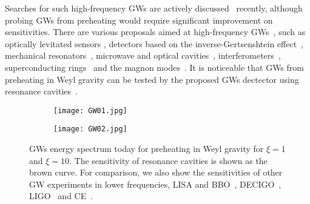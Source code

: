 \documentclass[12pt, a4paper]{article}
\begin{document}
Searches for such high-frequency GWs are actively discussed~\cite{Liu:2023mll,Ito:2023fcr,Ito:2023nkq} recently, although probing GWs from preheating would require significant improvement on sensitivities. There are various proposals aimed at high-frequency GWs~\cite{Aggarwal:2020olq}, such as optically levitated sensors \cite{Aggarwal:2020umq}, detectors based on the inverse-Gertsenshtein effect~\cite{1962Wave, Braginskii:1973vm}, mechanical resonators~\cite{Goryachev:2014nna,Goryachev:2014yra,Aguiar:2010kn,Gottardi:2007zn}, microwave and optical cavities~\cite{Mensky:2009zz,Caves:1979kq}, interferometers~\cite{Ackley:2020atn, Bailes:2019oma, Akutsu:2008qv}, superconducting rings~\cite{CMB-S4:2020lpa} and the magnon modes~\cite{Ito:2019wcb, Ito:2022rxn}. It is noticeable that GWs from preheating in Weyl gravity can be tested by the proposed GWs dectector using resonance cavities~\cite{Herman:2020wao, Herman:2022fau}.
\begin{figure}[t]
  \centering
  \begin{subfigure}[b]{0.49\textwidth}
    \texttt{[image: GW01.jpg]}
    \label{fig:fig6subfig1}
  \end{subfigure}
  \hfill
  \begin{subfigure}[b]{0.49\textwidth}
    \texttt{[image: GW02.jpg]}
    \label{fig:fig6subfig2}
  \end{subfigure}
  \caption{GWs energy spectrum today for preheating in Weyl gravity for $\xi=1$ and $\xi=10$. The sensitivity of resonance cavities is shown as the brown curve\cite{Herman:2020wao, Herman:2022fau}. For comparison, we also show the sensitivities of other GW experiments in lower frequencies, LISA and BBO~\cite{Thrane:2013oya}, DECIGO~\cite{Seto:2001qf}, LIGO~\cite{KAGRA:2013rdx} and CE~\cite{Reitze:2019iox}.} 
  \label{fig:fig6}
\end{figure}
\end{document}
